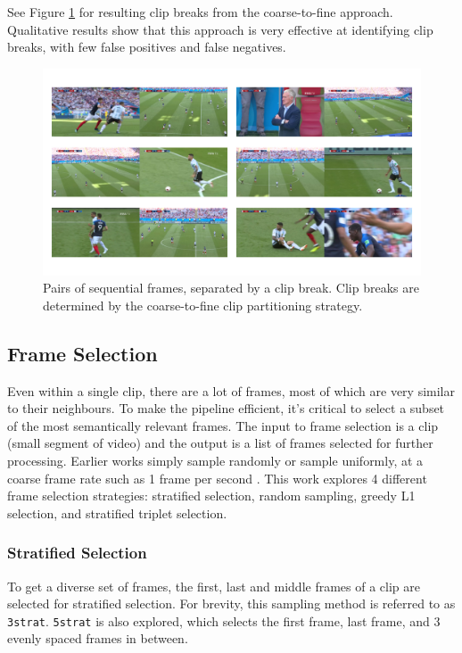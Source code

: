 See Figure \ref{fig:breaks} for resulting clip breaks from the coarse-to-fine approach.
Qualitative results show that this approach is very effective at identifying clip breaks, with few false positives and false negatives.

\begin{figure}
      \centering
      \includegraphics[width=\textwidth]{figures/breaks.png}
      \caption{Pairs of sequential frames, separated by a clip break. Clip breaks are determined by the coarse-to-fine clip partitioning strategy.}
      \label{fig:breaks}
\end{figure}


\subsection{Frame Selection}

Even within a single clip, there are a lot of frames, most of which are very similar to their neighbours.
To make the pipeline efficient, it's critical to select a subset of the most semantically relevant frames.
The input to frame selection is a clip (small segment of video) and the output is a list of frames selected for further processing.
Earlier works simply sample randomly \cite{clipbert} or sample uniformly, at a coarse frame rate such as 1 frame per second \cite{clip4clip}.
This work explores 4 different frame selection strategies:
stratified selection, random sampling, greedy L1 selection, and stratified triplet selection.

\subsubsection{Stratified Selection}
To get a diverse set of frames, the first, last and middle frames of a clip are selected for stratified selection.
For brevity, this sampling method is referred to as \verb|3strat|. 
\verb|5strat| is also explored, which selects the first frame, last frame, and 3 evenly spaced frames in between.

